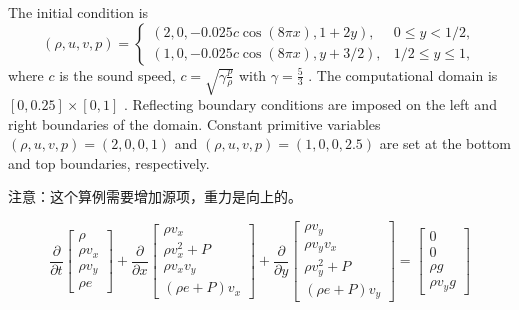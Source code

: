 \documentclass{book}
\begin{document}
\begin{example}
    \cite{liang2024new}
    The initial condition is
    \begin{equation}
        (\rho, u, v, p)=\left\{\begin{array}{ll}
            (2,0,-0.025 c \cos (8 \pi x), 1+2 y),   & 0 \leq y<1 / 2,      \\
            (1,0,-0.025 c \cos (8 \pi x), y+3 / 2), & 1 / 2 \leq y \leq 1,
        \end{array}\right.
    \end{equation}
    where  $c$  is the sound speed,  $c=\sqrt{\gamma \frac{p}{\rho}}$  with  $\gamma=\frac{5}{3}$ . The computational domain is  $[0,0.25] \times[0,1]$ . Reflecting boundary conditions are imposed on the left and right boundaries of the domain. Constant primitive variables  $(\rho, u, v, p)=(2,0,0,1)$  and  $(\rho, u, v, p)=(1,0,0,2.5)$  are set at the bottom and top boundaries, respectively.

    注意：这个算例需要增加源项，重力是向上的。

    \begin{equation}
        \frac{\partial}{\partial t}\begin{bmatrix}
            \rho       \\
            \rho v_{x} \\
            \rho v_{y} \\
            \rho e
        \end{bmatrix}+\frac{\partial}{\partial x}\begin{bmatrix}
            \rho v_{x}       \\
            \rho v_{x}^{2}+P \\
            \rho v_{x} v_{y} \\
            (\rho e+P) v_{x}
        \end{bmatrix}+\frac{\partial}{\partial y}\begin{bmatrix}
            \rho v_{y}       \\
            \rho v_{y} v_{x} \\
            \rho v_{y}^{2}+P \\
            (\rho e+P) v_{y}
        \end{bmatrix}=\begin{bmatrix}
            0      \\
            0      \\
            \rho g \\
            \rho v_{y} g
        \end{bmatrix}
    \end{equation}


\end{example}
\end{document}
